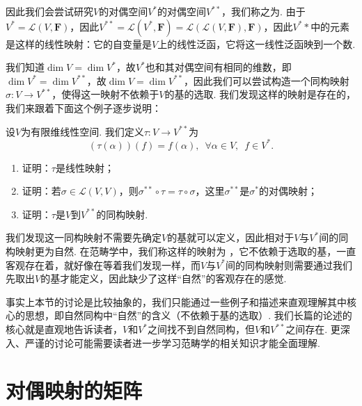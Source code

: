 因此我们会尝试研究$V$的对偶空间$V^*$的对偶空间$V^{**}$，我们称之为. 由于$V^*=\mathcal{L}(V,\mathbf{F})$，因此$V^{**}=\mathcal{L}(V^*,\mathbf{F})=\mathcal{L}(\mathcal{L}(V,\mathbf{F}),\mathbf{F})$，因此$V^**$中的元素是这样的线性映射：它的自变量是$V$上的线性泛函，它将这一线性泛函映到一个数.

我们知道$\dim V=\dim V^*$，故$V^*$也和其对偶空间有相同的维数，即$\dim V^*=\dim V^{**}$，故$\dim V=\dim V^{**}$，因此我们可以尝试构造一个同构映射$\sigma:V\to V^{**}$，使得这一映射不依赖于$V$的基的选取. 我们发现这样的映射是存在的，我们来跟着下面这个例子逐步说明：
\begin{example}
    设$V$为有限维线性空间. 我们定义$\tau:V\to V^{**}$为
    \[(\tau(\alpha))(f)=f(\alpha),\enspace\forall \alpha\in V,\enspace f\in V^*.\]
    \begin{enumerate}
        \item 证明：$\tau$是线性映射；

        \item 证明：若$\sigma\in\mathcal{L}(V,V)$，则$\sigma^{**}\circ\tau=\tau\circ\sigma$，这里$\sigma^{**}$是$\sigma^*$的对偶映射；

        \item 证明：$\tau$是$V$到$V^{**}$的同构映射.
    \end{enumerate}
\end{example}

\begin{solution}

\end{solution}

我们发现这一同构映射不需要先确定$V$的基就可以定义，因此相对于$V$与$V^*$间的同构映射更为自然. 在范畴学中，我们称这样的映射为
，它不依赖于选取的基，一直客观存在着，就好像在等着我们发现一样，而$V$与$V^*$间的同构映射则需要通过我们先取出$V$的基才能定义，因此缺少了这样``自然''的客观存在的感觉.

事实上本节的讨论是比较抽象的，我们只能通过一些例子和描述来直观理解其中核心的思想，即自然同构中``自然''的含义（不依赖于基的选取）. 我们长篇的论述的核心就是直观地告诉读者，$V$和$V^*$之间找不到自然同构，但$V$和$V^{**}$之间存在. 更深入、严谨的讨论可能需要读者进一步学习范畴学的相关知识才能全面理解.

\section{对偶映射的矩阵}

